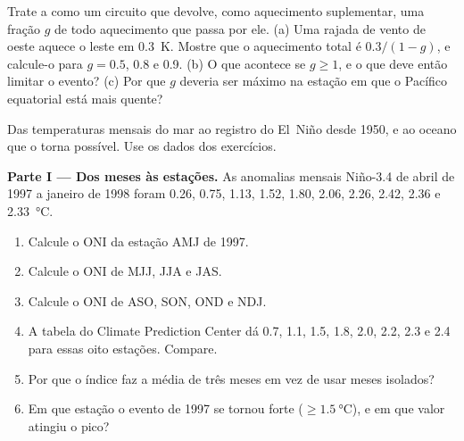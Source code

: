 \begin{exercise}[$\star\star\star$]\label{exo:b2:climate-variability:12}
Trate a  como um circuito que devolve, como aquecimento suplementar, uma fração $g$ de todo
aquecimento que passa por ele. (a) Uma rajada de vento de oeste aquece o leste em \qty{0.3}{K}. Mostre
que o aquecimento total é $0.3/(1 - g)$, e calcule-o para $g = 0.5$, 0.8 e 0.9. (b) O que
acontece se $g \geq 1$, e o que deve então limitar o evento? (c) Por que $g$ deveria ser máximo na
estação em que o Pacífico equatorial está mais quente?
\end{exercise}

\begin{problem}\label{pb:b2:climate-variability:1}
Das temperaturas mensais do mar ao registro do El~Niño desde 1950, e ao oceano que o torna
possível. Use os dados dos exercícios.

\medskip\noindent\textbf{Parte I --- Dos meses às estações.}
As anomalias mensais Niño-3.4 de abril de 1997 a janeiro de 1998 foram 0.26, 0.75, 1.13, 1.52, 1.80,
2.06, 2.26, 2.42, 2.36 e \qty{2.33}{\celsius}.
\begin{enumerate}
  \item Calcule o ONI da estação AMJ de 1997.
  \item Calcule o ONI de MJJ, JJA e JAS.
  \item Calcule o ONI de ASO, SON, OND e NDJ.
  \item A tabela do Climate Prediction Center dá 0.7, 1.1, 1.5, 1.8, 2.0, 2.2, 2.3 e
        2.4 para essas oito estações. Compare.
  \item Por que o índice faz a média de três meses em vez de usar meses isolados?
  \item Em que estação o evento de 1997 se tornou forte ($\geq \qty{1.5}{\celsius}$), e em
        que valor atingiu o pico?
\end{enumerate}


\end{problem}
